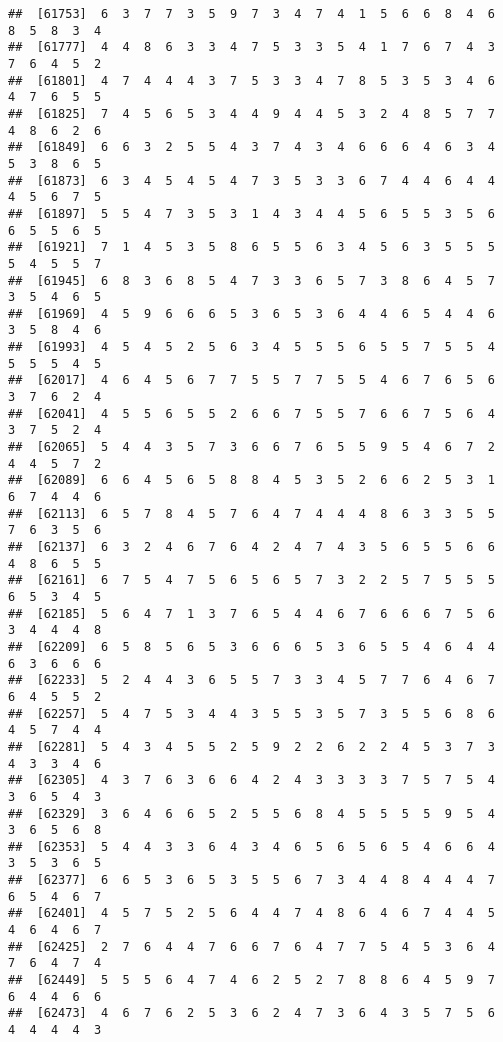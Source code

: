 \documentclass[
]{book}
\begin{document}
\begin{verbatim}
##  [61753]  6  3  7  7  3  5  9  7  3  4  7  4  1  5  6  6  8  4  6  8  5  8  3  4
##  [61777]  4  4  8  6  3  3  4  7  5  3  3  5  4  1  7  6  7  4  3  7  6  4  5  2
##  [61801]  4  7  4  4  4  3  7  5  3  3  4  7  8  5  3  5  3  4  6  4  7  6  5  5
##  [61825]  7  4  5  6  5  3  4  4  9  4  4  5  3  2  4  8  5  7  7  4  8  6  2  6
##  [61849]  6  6  3  2  5  5  4  3  7  4  3  4  6  6  6  4  6  3  4  5  3  8  6  5
##  [61873]  6  3  4  5  4  5  4  7  3  5  3  3  6  7  4  4  6  4  4  4  5  6  7  5
##  [61897]  5  5  4  7  3  5  3  1  4  3  4  4  5  6  5  5  3  5  6  6  5  5  6  5
##  [61921]  7  1  4  5  3  5  8  6  5  5  6  3  4  5  6  3  5  5  5  5  4  5  5  7
##  [61945]  6  8  3  6  8  5  4  7  3  3  6  5  7  3  8  6  4  5  7  3  5  4  6  5
##  [61969]  4  5  9  6  6  6  5  3  6  5  3  6  4  4  6  5  4  4  6  3  5  8  4  6
##  [61993]  4  5  4  5  2  5  6  3  4  5  5  5  6  5  5  7  5  5  4  5  5  5  4  5
##  [62017]  4  6  4  5  6  7  7  5  5  7  7  5  5  4  6  7  6  5  6  3  7  6  2  4
##  [62041]  4  5  5  6  5  5  2  6  6  7  5  5  7  6  6  7  5  6  4  3  7  5  2  4
##  [62065]  5  4  4  3  5  7  3  6  6  7  6  5  5  9  5  4  6  7  2  4  4  5  7  2
##  [62089]  6  6  4  5  6  5  8  8  4  5  3  5  2  6  6  2  5  3  1  6  7  4  4  6
##  [62113]  6  5  7  8  4  5  7  6  4  7  4  4  4  8  6  3  3  5  5  7  6  3  5  6
##  [62137]  6  3  2  4  6  7  6  4  2  4  7  4  3  5  6  5  5  6  6  4  8  6  5  5
##  [62161]  6  7  5  4  7  5  6  5  6  5  7  3  2  2  5  7  5  5  5  6  5  3  4  5
##  [62185]  5  6  4  7  1  3  7  6  5  4  4  6  7  6  6  6  7  5  6  3  4  4  4  8
##  [62209]  6  5  8  5  6  5  3  6  6  6  5  3  6  5  5  4  6  4  4  6  3  6  6  6
##  [62233]  5  2  4  4  3  6  5  5  7  3  3  4  5  7  7  6  4  6  7  6  4  5  5  2
##  [62257]  5  4  7  5  3  4  4  3  5  5  3  5  7  3  5  5  6  8  6  4  5  7  4  4
##  [62281]  5  4  3  4  5  5  2  5  9  2  2  6  2  2  4  5  3  7  3  4  3  3  4  6
##  [62305]  4  3  7  6  3  6  6  4  2  4  3  3  3  3  7  5  7  5  4  3  6  5  4  3
##  [62329]  3  6  4  6  6  5  2  5  5  6  8  4  5  5  5  5  9  5  4  3  6  5  6  8
##  [62353]  5  4  4  3  3  6  4  3  4  6  5  6  5  6  5  4  6  6  4  3  5  3  6  5
##  [62377]  6  6  5  3  6  5  3  5  5  6  7  3  4  4  8  4  4  4  7  6  5  4  6  7
##  [62401]  4  5  7  5  2  5  6  4  4  7  4  8  6  4  6  7  4  4  5  4  6  4  6  7
##  [62425]  2  7  6  4  4  7  6  6  7  6  4  7  7  5  4  5  3  6  4  7  6  4  7  4
##  [62449]  5  5  5  6  4  7  4  6  2  5  2  7  8  8  6  4  5  9  7  6  4  4  6  6
##  [62473]  4  6  7  6  2  5  3  6  2  4  7  3  6  4  3  5  7  5  6  4  4  4  4  3

\end{verbatim}
\end{document}
